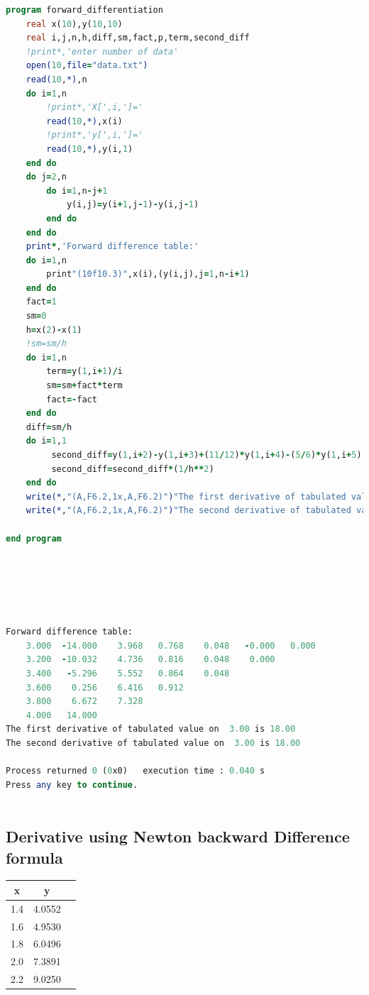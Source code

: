 \documentclass{article}
\begin{document}
\begin{lstlisting}[language=Fortran,caption=Numerical Forward Differentiation]
program forward_differentiation
    real x(10),y(10,10)
    real i,j,n,h,diff,sm,fact,p,term,second_diff
    !print*,'enter number of data'
    open(10,file="data.txt")
    read(10,*),n
    do i=1,n
        !print*,'X[',i,']='
        read(10,*),x(i)
        !print*,'y[',i,']='
        read(10,*),y(i,1)
    end do
    do j=2,n
        do i=1,n-j+1
            y(i,j)=y(i+1,j-1)-y(i,j-1)
        end do
    end do
    print*,'Forward difference table:'
    do i=1,n
        print"(10f10.3)",x(i),(y(i,j),j=1,n-i+1)
    end do
    fact=1
    sm=0
    h=x(2)-x(1)
    !sm=sm/h
    do i=1,n
        term=y(1,i+1)/i
        sm=sm+fact*term
        fact=-fact
    end do
    diff=sm/h
    do i=1,1
         second_diff=y(1,i+2)-y(1,i+3)+(11/12)*y(1,i+4)-(5/6)*y(1,i+5)
         second_diff=second_diff*(1/h**2)
    end do
    write(*,"(A,F6.2,1x,A,F6.2)")"The first derivative of tabulated value on",x(1),"is",diff
    write(*,"(A,F6.2,1x,A,F6.2)")"The second derivative of tabulated value on",x(1), "is",second_diff

end program







\end{lstlisting}
\begin{lstlisting}[language=Fortran,caption=Numerical Forward Differentiation Output]
 Forward difference table:
    3.000  -14.000    3.968   0.768    0.048   -0.000   0.000
    3.200  -10.032    4.736   0.816    0.048    0.000
    3.400   -5.296    5.552   0.864    0.048
    3.600    0.256    6.416   0.912
    3.800    6.672    7.328
    4.000   14.000
The first derivative of tabulated value on  3.00 is 18.00
The second derivative of tabulated value on  3.00 is 18.00

Process returned 0 (0x0)   execution time : 0.040 s
Press any key to continue.
 
\end{lstlisting}
\subsection{Derivative using Newton backward Difference formula}
\begin{center}
\begin{tabular}{ |c|c|c| } 
\hline
 x & y\\
 \hline
 1.4 & 4.0552  \\  \hline
 1.6 & 4.9530  \\  \hline
 1.8 & 6.0496 \\  \hline
 2.0 & 7.3891  \\  \hline
 2.2 & 9.0250 \\  \hline

 
 \hline
\end{tabular}
\end{center}
\end{document}
